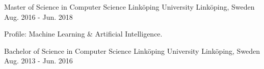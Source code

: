 

\begin{cventries}

  \cventry
    {Master of Science in Computer Science} %
    {Linköping University} %
    {Linköping, Sweden} %
    {Aug. 2016 - Jun. 2018} %
    {
      \begin{cvitems} %
        \item {Profile: Machine Learning \& Artificial Intelligence.}
      \end{cvitems}
    }

  \cventry
    {Bachelor of Science in Computer Science} %
    {Linköping University} %
    {Linköping, Sweden} %
    {Aug. 2013 - Jun. 2016} %
    {}

\end{cventries}
